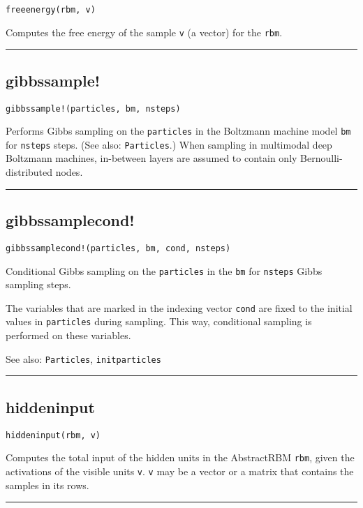 \begin{verbatim}
freeenergy(rbm, v)
\end{verbatim}
Computes the free energy of the sample \texttt{v} (a vector) for the \texttt{rbm}.

\noindent\rule{\textwidth}{1pt}
\subsection*{gibbssample!}
\begin{verbatim}
gibbssample!(particles, bm, nsteps)
\end{verbatim}
Performs Gibbs sampling on the \texttt{particles} in the Boltzmann machine model \texttt{bm} for \texttt{nsteps} steps. (See also: \texttt{Particles}.) When sampling in multimodal deep Boltzmann machines, in-between layers are assumed to contain only Bernoulli-distributed nodes.

\noindent\rule{\textwidth}{1pt}
\subsection*{gibbssamplecond!}
\begin{verbatim}
gibbssamplecond!(particles, bm, cond, nsteps)
\end{verbatim}
Conditional Gibbs sampling on the \texttt{particles} in the \texttt{bm} for \texttt{nsteps} Gibbs sampling steps.

The variables that are marked in the indexing vector \texttt{cond} are fixed to the initial values in \texttt{particles} during sampling. This way, conditional sampling is performed on these variables.

See also: \texttt{Particles}, \texttt{initparticles}

\noindent\rule{\textwidth}{1pt}
\subsection*{hiddeninput}
\begin{verbatim}
hiddeninput(rbm, v)
\end{verbatim}
Computes the total input of the hidden units in the AbstractRBM \texttt{rbm}, given the activations of the visible units \texttt{v}. \texttt{v} may be a vector or a matrix that contains the samples in its rows.

\noindent\rule{\textwidth}{1pt}
